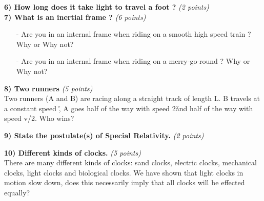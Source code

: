 \textbf{6) How long does it take light to travel a foot ?} \hfill \textit{(2 points)}\\


\clearpage
\textbf{7) What is an inertial frame ? } \hfill \textit{(6 points)}\\
\begin{itemize}
\item[-]{ Are you in an internal frame when riding on a smooth high speed train ? Why or Why not?}
\item[-]{ Are you in an internal frame when riding on a merry-go-round ? Why or Why not?}
\end{itemize}

\vspace*{0.25in}


\textbf{8) Two runners } \hfill \textit{(5 points)}\\

Two runners (A and B) are racing along a straight track of length L. B travels at a constant speed \v, A goes half of the way with speed 2\v and half of the way with speed v/2. Who wins?  

\vspace*{0.25in}

\textbf{9) State the postulate(s) of Special Relativity.} \hfill \textit{(2 points)}\\

\vspace*{0.25in}

\textbf{10) Different kinds of clocks. } \hfill \textit{(5 points)}\\

There are many different kinds of clocks: sand clocks, electric clocks, mechanical clocks, light clocks and biological clocks.
We have shown that  light clocks in motion slow down,  does this  necessarily imply that  all  clocks will be effected equally?



